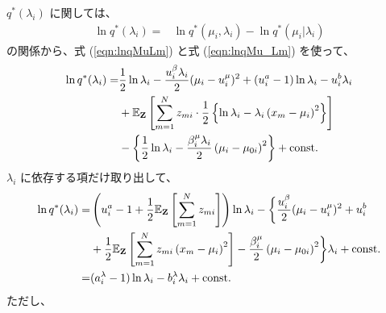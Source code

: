 $q^*(\lambda_i)$ に関しては、
\begin{align}
  \ln q^*(\lambda_i)  =&  \ln q^*(\mu_i, \lambda_i) - \ln q^*(\mu_i | \lambda_i)
\end{align}
の関係から、式 (\ref{eqn:lnqMuLm}) と式 (\ref{eqn:lnqMu_Lm}) を使って、
\begin{align}
  \ln q^*(\lambda_i)  =&  \frac{1}{2} \ln \lambda_i - \frac{u_i^\beta \lambda_i}{2} (\mu_i - u_i^\mu)^2 + (u_i^a - 1) \ln \lambda_i - u_i^b \lambda_i  \notag  \\
  &  + \mathbb{E}_{{\bf Z}}\left[ \sum_{m=1}^N z_{mi} \cdot \frac{1}{2} \left\{ \ln \lambda_i - \lambda_i \left( {x_m} - \mu_i \right)^2 \right\} \right]   \notag  \\  
  &  - \left\{ \frac{1}{2} \ln \lambda_i - \frac{\beta_i^\mu \lambda_i}{2} \left( \mu_i - \mu_{0i} \right)^2  \right\}
    + {\rm const.}
\end{align}
$\lambda_i$ に依存する項だけ取り出して、
\begin{align}
  \ln q^*(\lambda_i)  =&  \left( u_i^a - 1 + \frac{1}{2} \mathbb{E}_{\bf Z}\left[ \sum_{m=1}^N z_{mi} \right] \right) \ln \lambda_i  
      - \biggl\{ \frac{u_i^\beta}{2} (\mu_i - u_i^\mu)^2 + u_i^b  \notag  \\  
    &  + \frac{1}{2} \mathbb{E}_{{\bf Z}}\left[ \sum_{m=1}^N z_{mi} \left( {x_m} - \mu_i \right)^2 \right] - \frac{\beta_i^\mu}{2} \left( \mu_i - \mu_{0i} \right)^2 \biggr\} \lambda_i
    + {\rm const.}  \\
%
  =&  (a_i^\lambda - 1) \ln \lambda_i - b_i^\lambda \lambda_i + {\rm const.}
\end{align}
ただし、
